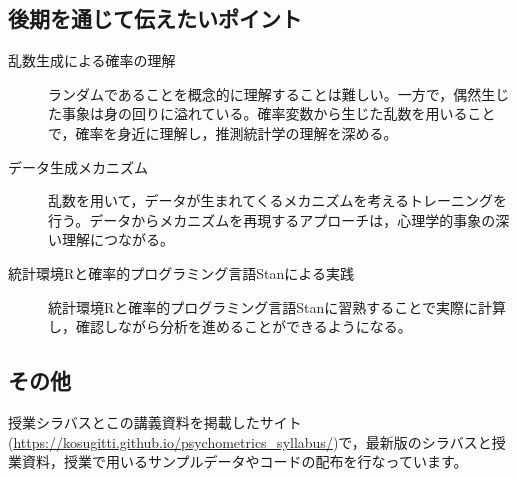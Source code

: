 \subsection*{後期を通じて伝えたいポイント}
\begin{description}
    \item[乱数生成による確率の理解] ランダムであることを概念的に理解することは難しい。一方で，偶然生じた事象は身の回りに溢れている。確率変数から生じた乱数を用いることで，確率を身近に理解し，推測統計学の理解を深める。
	\item[データ生成メカニズム] 乱数を用いて，データが生まれてくるメカニズムを考えるトレーニングを行う。データからメカニズムを再現するアプローチは，心理学的事象の深い理解につながる。
	\item[統計環境Rと確率的プログラミング言語Stanによる実践] 統計環境Rと確率的プログラミング言語Stanに習熟することで実際に計算し，確認しながら分析を進めることができるようになる。
\end{description}

\subsection*{その他}
授業シラバスとこの講義資料を掲載したサイト(\url{https://kosugitti.github.io/psychometrics_syllabus/})で，最新版のシラバスと授業資料，授業で用いるサンプルデータやコードの配布を行なっています。
